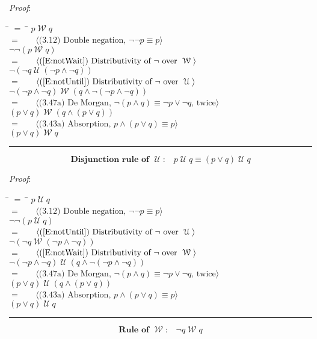 \documentclass[12pt, fleqn, leqno]{article}
\newcommand{\lgap}{2pt}                             %
\newcommand{\mymathindent}{24pt}                    %
\newcommand{\Until}{\;\mathcal{U}\;}
\newcommand{\Wait}{\;\mathcal{W}\;}
\newcommand{\myqed}{\rule[-.23ex]{1.2ex}{2.0ex}}
\newcommand{\myqedtab}{\hspace{384pt}}              %
\newcommand{\Gll} {\langle}                         %
\newcommand{\Ggg} {\rangle}                         %
\newcommand{\Hint}[1]     {\ \ \ $\Gll              \mbox{#1} \Ggg$ }   %
\begin{document}
\emph{Proof}:
\begin{tabbing}
\hspace{\mymathindent} \= $= \;$ \= \myqedtab \= \kill
\> \> $p\Wait q$\\[\lgap]
\> $=$ \> \Hint{(3.12) Double negation, $\neg\neg p\equiv p$} \\[\lgap]
\> \> $\neg\neg (p\Wait q)$\\[\lgap]
\> $=$ \> \Hint{(\ref{E:notWait}) Distributivity of $\neg$ over $\Wait$} \\[\lgap]
\> \> $\neg (\neg q\Until (\neg p\land \neg q))$\\[\lgap]
\> $=$ \> \Hint{(\ref{E:notUntil}) Distributivity of $\neg$ over $\Until$} \\[\lgap]
\> \> $\neg (\neg p\land \neg q)\Wait (q\land \neg (\neg p\land \neg q))$\\[\lgap]
\> $=$ \> \Hint{(3.47a) De Morgan, $\neg (p\land q)\equiv \neg p\lor \neg q$, twice} \\[\lgap]
\> \> $( p\lor q)\Wait (q\land (p\lor q))$\\[\lgap]
\> $=$ \> \Hint{(3.43a) Absorption, $p\land (p\lor q) \equiv p$} \\[\lgap]
\> \> $(p\lor q) \Wait q$ \quad \myqed
\end{tabbing}
\begin{equation}\label{E:disRuleUntil}
\textbf{Disjunction rule of $\Until$:}\quad p\Until q\equiv (p\lor q)\Until q
\end{equation}

\emph{Proof}:
\begin{tabbing}
\hspace{\mymathindent} \= $= \;$ \= \myqedtab \= \kill
\> \> $p\Until q$\\[\lgap]
\> $=$ \> \Hint{(3.12) Double negation, $\neg\neg p\equiv p$} \\[\lgap]
\> \> $\neg\neg (p\Until q)$\\[\lgap]
\> $=$ \> \Hint{(\ref{E:notUntil}) Distributivity of $\neg$ over $\Until$} \\[\lgap]
\> \> $\neg (\neg q\Wait (\neg p\land \neg q))$\\[\lgap]
\> $=$ \> \Hint{(\ref{E:notWait}) Distributivity of $\neg$ over $\Wait$} \\[\lgap]
\> \> $\neg (\neg p\land \neg q)\Until (q\land \neg (\neg p\land \neg q))$\\[\lgap]
\> $=$ \> \Hint{(3.47a) De Morgan, $\neg (p\land q)\equiv \neg p\lor \neg q$, twice} \\[\lgap]
\> \> $( p\lor q)\Until (q\land (p\lor q))$\\[\lgap]
\> $=$ \> \Hint{(3.43a) Absorption, $p\land (p\lor q) \equiv p$} \\[\lgap]
\> \> $(p\lor q) \Until q$ \quad \myqed
\end{tabbing}
\begin{equation}\label{E:ruleWait}
\textbf{Rule of $\Wait$:}\quad \neg q \Wait q
\end{equation}
\end{document}
